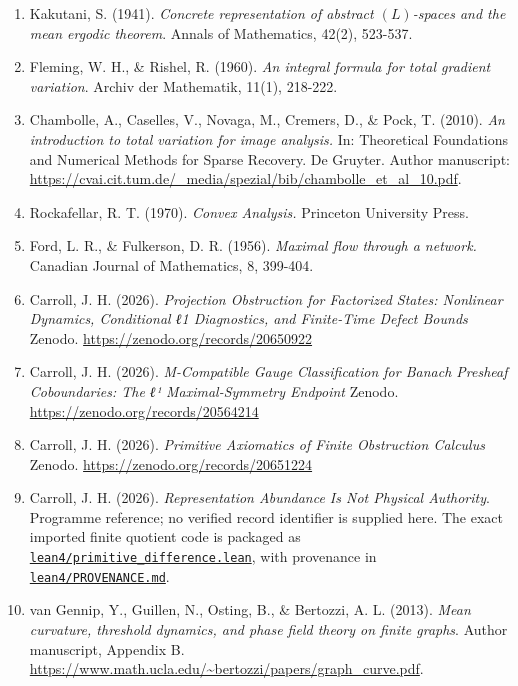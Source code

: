 \documentclass[
  11pt,
]{article}
\providecommand{\tightlist}{%
  \setlength{\itemsep}{0pt}\setlength{\parskip}{0pt}}
\providecommand{\tightlist}{%
  \setlength{\itemsep}{0pt}\setlength{\parskip}{0pt}}
\begin{document}
\begin{enumerate}
\def\labelenumi{\arabic{enumi}.}
\tightlist
\item
  Kakutani, S. (1941). \emph{Concrete representation of abstract
  \((L)\)-spaces and the mean ergodic theorem}. Annals of Mathematics,
  42(2), 523-537.
\item
  Fleming, W. H., \& Rishel, R. (1960). \emph{An integral formula for
  total gradient variation}. Archiv der Mathematik, 11(1), 218-222.
\item
  Chambolle, A., Caselles, V., Novaga, M., Cremers, D., \& Pock, T.
  (2010). \emph{An introduction to total variation for image analysis.}
  In: Theoretical Foundations and Numerical Methods for Sparse Recovery.
  De Gruyter. Author manuscript:
  \url{https://cvai.cit.tum.de/_media/spezial/bib/chambolle_et_al_10.pdf}.
\item
  Rockafellar, R. T. (1970). \emph{Convex Analysis.} Princeton
  University Press.
\item
  Ford, L. R., \& Fulkerson, D. R. (1956). \emph{Maximal flow through a
  network.} Canadian Journal of Mathematics, 8, 399-404.
\item
  Carroll, J. H. (2026). \emph{Projection Obstruction for Factorized
  States: Nonlinear Dynamics, Conditional ℓ1 Diagnostics, and
  Finite-Time Defect Bounds} Zenodo.
  \url{https://zenodo.org/records/20650922}
\item
  Carroll, J. H. (2026). \emph{M-Compatible Gauge Classification for
  Banach Presheaf Coboundaries: The ℓ¹ Maximal-Symmetry Endpoint}
  Zenodo. \url{https://zenodo.org/records/20564214}
\item
  Carroll, J. H. (2026). \emph{Primitive Axiomatics of Finite
  Obstruction Calculus} Zenodo.
  \url{https://zenodo.org/records/20651224}
\item
  Carroll, J. H. (2026). \emph{Representation Abundance Is Not Physical
  Authority}. Programme reference; no verified record identifier is
  supplied here. The exact imported finite quotient code is packaged as
  \href{lean4/primitive_difference.lean}{\texttt{lean4/\allowbreak{}primitive\_\allowbreak{}difference.lean}},
  with provenance in
  \href{lean4/PROVENANCE.md}{\texttt{lean4/\allowbreak{}PROVENANCE.md}}.
\item
  van Gennip, Y., Guillen, N., Osting, B., \& Bertozzi, A. L. (2013).
  \emph{Mean curvature, threshold dynamics, and phase field theory on
  finite graphs}. Author manuscript, Appendix B.
  \url{https://www.math.ucla.edu/~bertozzi/papers/graph_curve.pdf}.
\end{enumerate}
\end{document}
